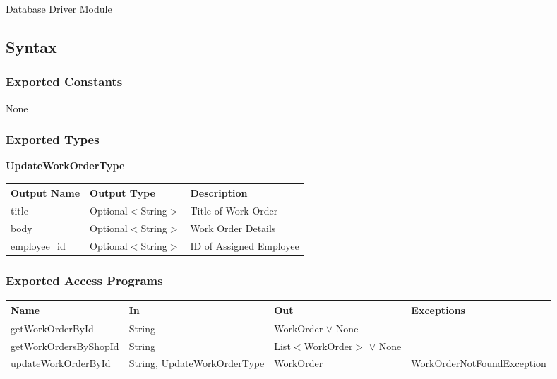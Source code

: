 \documentclass[12pt, titlepage]{article}
\begin{document}
Database Driver Module

\subsection{Syntax}

\subsubsection{Exported Constants}

None

\subsubsection{Exported Types}

\textbf{UpdateWorkOrderType}

\begin{table}[H]
	\begin{tabular}{|p{}|p{}|p{}|}
		\hline
		\textbf{Output Name} & \textbf{Output Type} & \textbf{Description}    \\
		\hline
		title                & Optional$<$String$>$ & Title of Work Order     \\
		\hline
		body                 & Optional$<$String$>$ & Work Order Details      \\
		\hline
		employee\_id         & Optional$<$String$>$ & ID of Assigned Employee \\
		\hline
	\end{tabular}
\end{table}

\subsubsection{Exported Access Programs}

\begin{center}
	\begin{adjustbox}{width=\textwidth}
		\begin{tabular}{llll}
			\hline
			\textbf{Name}         & \textbf{In}                 & \textbf{Out}                    & \textbf{Exceptions}        \\
			\hline
			getWorkOrderById      & String                      & WorkOrder $\lor$ None           & ~                          \\
			getWorkOrdersByShopId & String                      & List$<$WorkOrder$>$ $\lor$ None & ~                          \\
			updateWorkOrderById   & String, UpdateWorkOrderType & WorkOrder                       & WorkOrderNotFoundException \\
			\hline
		\end{tabular}
	\end{adjustbox}
\end{center}
\end{document}
